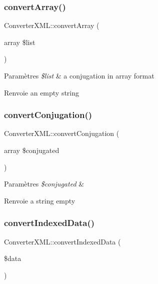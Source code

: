 \subsubsection{\texorpdfstring{convert\+Array()}{convertArray()}}
{\footnotesize\ttfamily Converter\+X\+M\+L\+::convert\+Array (\begin{DoxyParamCaption}\item[{array}]{\$list }\end{DoxyParamCaption})}


\begin{DoxyParams}{Paramètres}
{\em \$list} & a conjugation in array format \\
\hline
\end{DoxyParams}
\begin{DoxyReturn}{Renvoie}
an empty string 
\end{DoxyReturn}
\hypertarget{classConverterXML_a4c2d281657ce13ceb048b56824fec42a}{}\label{classConverterXML_a4c2d281657ce13ceb048b56824fec42a} 
\subsubsection{\texorpdfstring{convert\+Conjugation()}{convertConjugation()}}
{\footnotesize\ttfamily Converter\+X\+M\+L\+::convert\+Conjugation (\begin{DoxyParamCaption}\item[{array}]{\$conjugated }\end{DoxyParamCaption})}


\begin{DoxyParams}{Paramètres}
{\em \$conjugated} & \\
\hline
\end{DoxyParams}
\begin{DoxyReturn}{Renvoie}
a string empty 
\end{DoxyReturn}
\hypertarget{classConverterXML_ab7c370229f1693cea20750b07cc0d1e7}{}\label{classConverterXML_ab7c370229f1693cea20750b07cc0d1e7} 
\subsubsection{\texorpdfstring{convert\+Indexed\+Data()}{convertIndexedData()}}
{\footnotesize\ttfamily Converter\+X\+M\+L\+::convert\+Indexed\+Data (\begin{DoxyParamCaption}\item[{}]{\$data }\end{DoxyParamCaption})}


